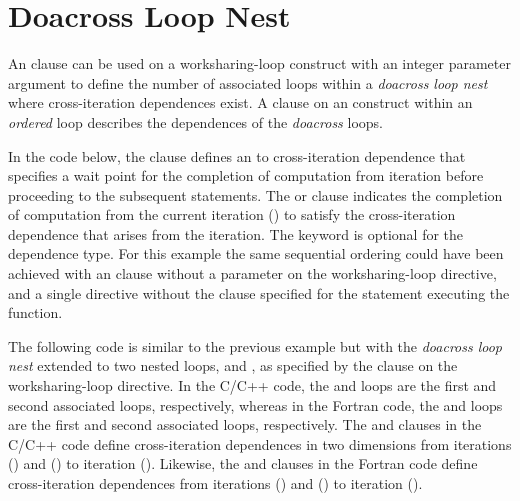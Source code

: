 \section{Doacross Loop Nest}
\label{sec:doacross}

An  clause can be used on a worksharing-loop construct with an integer
parameter argument to define the number of associated loops within 
a \emph{doacross loop nest} where cross-iteration dependences exist.
A  clause on an  construct within an \emph{ordered}
loop describes the dependences of the \emph{doacross} loops. 

In the code below, the  clause defines an  
to  cross-iteration dependence that specifies a wait point for 
the completion of computation from iteration  before proceeding 
to the subsequent statements. The  
or  clause indicates 
the completion of computation from the current iteration () 
to satisfy the cross-iteration dependence that arises from the iteration.
The  keyword is optional for the 
dependence type.
For this example the same sequential ordering could have been achieved 
with an  clause without a parameter on the worksharing-loop directive,
and a single  directive without the  clause
specified for the statement executing the  function.



The following code is similar to the previous example but with 
the \emph{doacross loop nest} extended to two nested loops,  and ,
as specified by the  clause on the worksharing-loop directive.
In the C/C++ code, the  and  loops are the first and
second associated loops, respectively, whereas
in the Fortran code, the  and  loops are the first and
second associated loops, respectively.
The  and  clauses in 
the C/C++ code define cross-iteration dependences in two dimensions from 
iterations () and () to iteration ().  
Likewise, the  and  clauses 
in the Fortran code define cross-iteration dependences from iterations 
() and () to iteration ().

